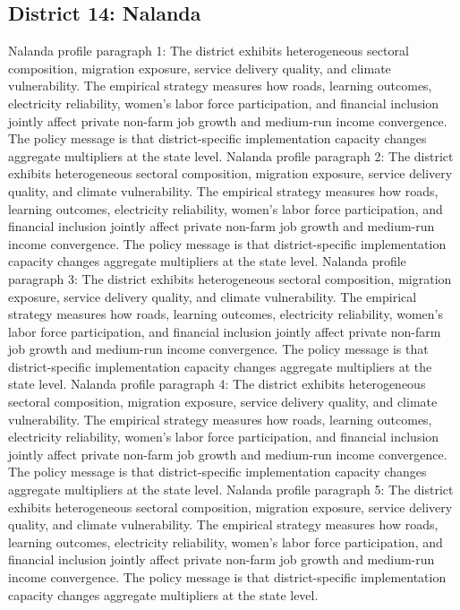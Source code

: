 \documentclass[preprint,12pt]{elsarticle}
\begin{document}
\subsection{District 14: Nalanda}
Nalanda profile paragraph 1: The district exhibits heterogeneous sectoral composition, migration exposure, service delivery quality, and climate vulnerability. The empirical strategy measures how roads, learning outcomes, electricity reliability, women's labor force participation, and financial inclusion jointly affect private non-farm job growth and medium-run income convergence. The policy message is that district-specific implementation capacity changes aggregate multipliers at the state level.
Nalanda profile paragraph 2: The district exhibits heterogeneous sectoral composition, migration exposure, service delivery quality, and climate vulnerability. The empirical strategy measures how roads, learning outcomes, electricity reliability, women's labor force participation, and financial inclusion jointly affect private non-farm job growth and medium-run income convergence. The policy message is that district-specific implementation capacity changes aggregate multipliers at the state level.
Nalanda profile paragraph 3: The district exhibits heterogeneous sectoral composition, migration exposure, service delivery quality, and climate vulnerability. The empirical strategy measures how roads, learning outcomes, electricity reliability, women's labor force participation, and financial inclusion jointly affect private non-farm job growth and medium-run income convergence. The policy message is that district-specific implementation capacity changes aggregate multipliers at the state level.
Nalanda profile paragraph 4: The district exhibits heterogeneous sectoral composition, migration exposure, service delivery quality, and climate vulnerability. The empirical strategy measures how roads, learning outcomes, electricity reliability, women's labor force participation, and financial inclusion jointly affect private non-farm job growth and medium-run income convergence. The policy message is that district-specific implementation capacity changes aggregate multipliers at the state level.
Nalanda profile paragraph 5: The district exhibits heterogeneous sectoral composition, migration exposure, service delivery quality, and climate vulnerability. The empirical strategy measures how roads, learning outcomes, electricity reliability, women's labor force participation, and financial inclusion jointly affect private non-farm job growth and medium-run income convergence. The policy message is that district-specific implementation capacity changes aggregate multipliers at the state level.
\end{document}
